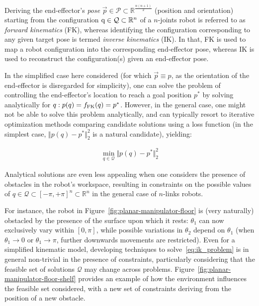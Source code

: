 Deriving the end-effector's \emph{pose} \( \vec{p} \in \mathcal{P} \subset \mathbb{R}^{\frac{n(n+1)}{2}} \) (position and orientation) starting from the configuration \( {\textnormal{q}} \in \mathcal Q \subset \mathbb R^n \) of a \( n \)-joints robot is referred to as \emph{forward kinematics} (FK), whereas identifying the configuration corresponding to any given target pose is termed \emph{inverse kinematics} (IK).
In that, FK is used to map a robot configuration into the corresponding end-effector pose, whereas IK is used to reconstruct the configuration(s) given an end-effector pose.

In the simplified case here considered (for which \( \vec{p} \equiv p \), as the orientation of the end-effector is disregarded for simplicity), one can solve the problem of controlling the end-effector's location to reach a goal position \( p^* \) by solving analytically for \( q: p(q) = f_{\text{FK}}(q) = p^*\).
However, in the general case, one might not be able to solve this problem analytically, and can typically resort to iterative optimization methods comparing candidate solutions using a loss function (in the simplest case, \( \Vert p(q) - p^* \Vert_2^2 \) is a natural candidate), yielding:

\begin{align}
\min_{q \in \mathcal Q} \Vert p(q) - p^* \Vert_2^2
\label{eq:ik_problem}
\end{align}

Analytical solutions are even less appealing when one considers the presence of obstacles in the robot's workspace, resulting in constraints on the possible values of \( q \in \mathcal Q \subset [-\pi, +\pi]^n \subset \mathbb R^n \) in the general case of \(n\)-links robots.

For instance, the robot in Figure~\ref{fig:planar-manipulator-floor} is (very naturally) obstacled by the presence of the surface upon which it rests: \( \theta_1 \) can now exclusively vary within \([0,  \pi] \), while possible variations in \( \theta_2 \) depend on \( \theta_1 \) (when \( \theta_1 \to 0 \) or \( \theta_1 \to \pi \), further downwards movements are restricted).
Even for a simplified kinematic model, developing techniques to solve~\ref{eq:ik_problem} is in general non-trivial in the presence of constraints, particularly considering that the feasible set of solutions \( \mathcal Q \) may change across problems.
Figure~\ref{fig:planar-manipulator-floor-shelf} provides an example of how the environment influences the feasible set considered, with a new set of constraints deriving from the position of a new obstacle.

